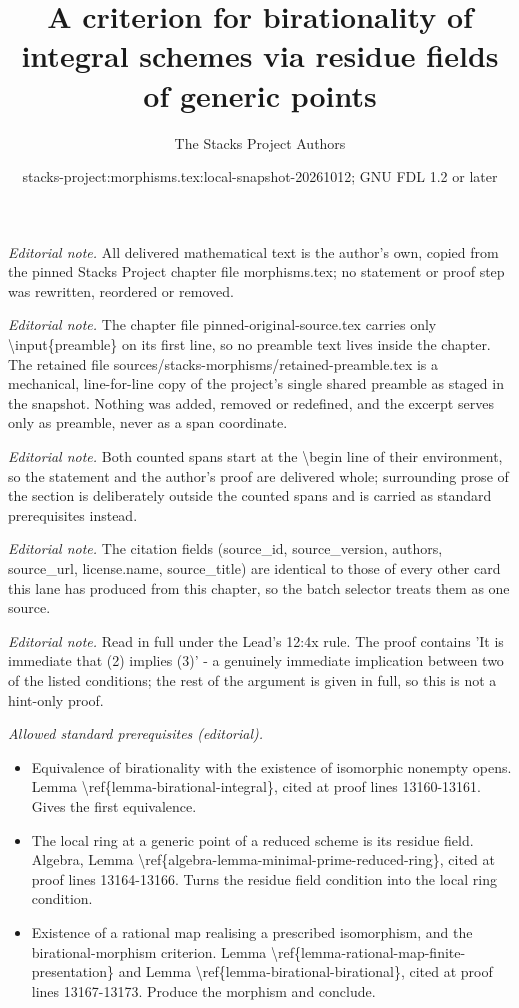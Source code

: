 \documentclass[10pt,a4paper]{amsart}
\title{A criterion for birationality of integral schemes via residue fields of generic points}
\author{The Stacks Project Authors}
\date{stacks-project:morphisms.tex:local-snapshot-20261012; GNU FDL 1.2 or later}
\theoremstyle{plain}
\theoremstyle{definition}
\theoremstyle{remark}
\numberwithin{equation}{subsection}
\begin{document}
\maketitle
\setcounter{subsection}{1}
\noindent\textit{Editorial note.} All delivered mathematical text is the author's own, copied from the pinned Stacks Project chapter file morphisms.tex; no statement or proof step was rewritten, reordered or removed.\par\medskip
\noindent\textit{Editorial note.} The chapter file pinned-original-source.tex carries only \textbackslash{}input\{preamble\} on its first line, so no preamble text lives inside the chapter. The retained file sources/stacks-morphisms/retained-preamble.tex is a mechanical, line-for-line copy of the project's single shared preamble as staged in the snapshot. Nothing was added, removed or redefined, and the excerpt serves only as preamble, never as a span coordinate.\par\medskip
\noindent\textit{Editorial note.} Both counted spans start at the \textbackslash{}begin line of their environment, so the statement and the author's proof are delivered whole; surrounding prose of the section is deliberately outside the counted spans and is carried as standard prerequisites instead.\par\medskip
\noindent\textit{Editorial note.} The citation fields (source\_id, source\_version, authors, source\_url, license.name, source\_title) are identical to those of every other card this lane has produced from this chapter, so the batch selector treats them as one source.\par\medskip
\noindent\textit{Editorial note.} Read in full under the Lead's 12:4x rule. The proof contains 'It is immediate that (2) implies (3)' - a genuinely immediate implication between two of the listed conditions; the rest of the argument is given in full, so this is not a hint-only proof.\par\medskip
\noindent\textit{Allowed standard prerequisites (editorial).}\begin{itemize}
\item Equivalence of birationality with the existence of isomorphic nonempty opens. Lemma \textbackslash{}ref\{lemma-birational-integral\}, cited at proof lines 13160-13161. Gives the first equivalence.
\item The local ring at a generic point of a reduced scheme is its residue field. Algebra, Lemma \textbackslash{}ref\{algebra-lemma-minimal-prime-reduced-ring\}, cited at proof lines 13164-13166. Turns the residue field condition into the local ring condition.
\item Existence of a rational map realising a prescribed isomorphism, and the birational-morphism criterion. Lemma \textbackslash{}ref\{lemma-rational-map-finite-presentation\} and Lemma \textbackslash{}ref\{lemma-birational-birational\}, cited at proof lines 13167-13173. Produce the morphism and conclude.
\end{itemize}\medskip
\end{document}
